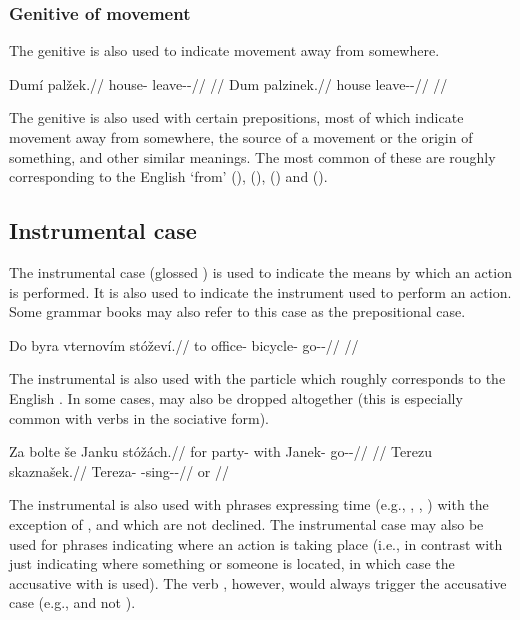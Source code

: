 \subsubsection{Genitive of movement}

The genitive is also used to indicate movement away from somewhere.

\pex
\a
\begingl
\gla Dumí palžek.//
\glb house-\Gen{} leave-\Av{}-\Pf{}//
\glft {}//
\endgl
\a
\begingl
\gla Dum palzinek.//
\glb house leave-\Pv{}-\Pf{}//
\glft {}//
\endgl
\xe

The genitive is also used with certain prepositions, most of which indicate
movement away from somewhere, the source of a movement or the origin of
something, and other similar meanings. The most common of these are 
roughly corresponding to the English `from' (),  (),
 () and
 ().

\subsection{Instrumental case}\label{sec:instrumental-case}

The instrumental case (glossed \Ins{}) is used to indicate the means by which an
action is performed. It is also used to indicate the instrument used to perform
an action. Some grammar books may also refer to this case as the prepositional
case.

\pex
\begingl
\gla Do byra vternovím stóževí.//
\glb to office-\Acc{} bicycle-\Ins{} go-\Av{}-\Cont{}//
\glft {}//
\endgl
\xe

The instrumental is also used with the particle  which roughly
corresponds to the English . In some cases,  may also be
dropped altogether (this is especially common with verbs in the sociative form).

\pex
\a\begingl
\gla Za bolte še Janku stóžách.//
\glb for party-\Acc{} with Janek-\Ins{} go-\Av{}-\Ctp{}//
\glft {}//
\endgl
\a\begingl
\gla Terezu skaznašek.//
\glb Tereza-\Ins{} \Soc{}-sing-\Av{}-\Pf{}//
\glft {} or //
\endgl
\xe

The instrumental is also used with phrases expressing time (e.g.,
, , ) with the
exception of ,  and
 which are not declined. The instrumental case may also
be used for phrases indicating where an action is taking place (i.e., in
contrast with just indicating where something or someone is located, in which
case the accusative with  is used). The verb , however, would always trigger the accusative case (e.g.,  and not ).

